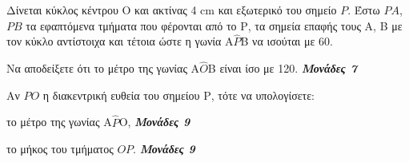 \documentclass[11pt,a4paper,twoside]{book}
\newcommand{\monades}[1]{
\hspace*{\fill}
\textbf{\textit{\textcolor{maincolor}{Μονάδες #1}}}}
\begin{document}
Δίνεται κύκλος κέντρου Ο και ακτίνας 4 cm και εξωτερικό του σημείο $P$. Έστω $PA$, $PB$ τα εφαπτόμενα τμήματα που φέρονται από το Ρ, τα σημεία επαφής τους A, B με τον κύκλο αντίστοιχα και τέτοια ώστε η γωνία Α$\hat{Ρ}$Β να ισούται με 60\degree.

\begin{alist}
\item Να αποδείξετε ότι το μέτρο της γωνίας Α$\hat{O}$Β είναι ίσο με 120\degree. \monades{7}

\item Αν $PO$ η διακεντρική ευθεία του σημείου Ρ, τότε να υπολογίσετε:

\begin{alist}
\item
  το μέτρο της γωνίας Α$\hat{Ρ}$Ο, \monades{9}
\item
  το μήκος του τμήματος $OP$. \monades{9}


\begin{center}
\end{center}
\end{alist}
\end{alist}
\end{document}
